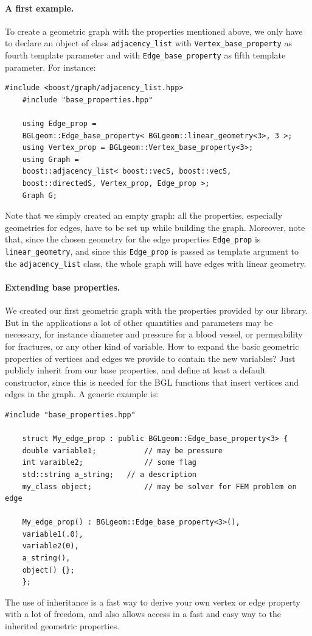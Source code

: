 \documentclass[10pt]{article} %
\newcommand{\classname}[1]{\texttt{#1}}
\begin{document}
	\paragraph{A first example.} To create a geometric graph with the properties mentioned above, we only have to declare an object of class \classname{adjacency\_list} with \classname{Vertex\_base\_property} as fourth template parameter and with \classname{Edge\_base\_property} as fifth template parameter. For instance:
	\begin{lstlisting}[frame=single]
	#include <boost/graph/adjacency_list.hpp>
	#include "base_properties.hpp"
	
	using Edge_prop = 
	BGLgeom::Edge_base_property< BGLgeom::linear_geometry<3>, 3 >;
	using Vertex_prop = BGLgeom::Vertex_base_property<3>;
	using Graph = 
	boost::adjacency_list< boost::vecS, boost::vecS, 
	boost::directedS, Vertex_prop, Edge_prop >;
	Graph G;
	\end{lstlisting}
	Note that we simply created an empty graph: all the properties, especially geometries for edges, have to be set up while building the graph. Moreover, note that, since the chosen geometry for the edge properties \texttt{Edge\_prop} is \texttt{linear\_geometry}, and since this \texttt{Edge\_prop} is passed as template argument to the \classname{adjacency\_list} class, the whole graph will have edges with linear geometry.
	\paragraph{Extending base properties.} We created our first geometric graph with the properties provided by our library. But in the applications a lot of other quantities and parameters may be necessary, for instance diameter and pressure for a blood vessel, or permeability for fractures, or any other kind of variable. How to expand the basic geometric properties of vertices and edges we provide to contain the new variables? Just publicly inherit from our base properties, and define at least a default constructor, since this is needed for the BGL functions that insert vertices and edges in the graph. A generic example is:
	\begin{lstlisting}[frame=single, name=create_graph]
	#include "base_properties.hpp"
	
	struct My_edge_prop : public BGLgeom::Edge_base_property<3> {
	double variable1;			// may be pressure
	int varaible2;				// some flag
	std::string a_string;	// a description
	my_class object;			// may be solver for FEM problem on edge
	
	My_edge_prop() : BGLgeom::Edge_base_property<3>(),
	variable1(.0),
	variable2(0),
	a_string(),
	object() {};	
	};
	\end{lstlisting}
	The use of inheritance is a fast way to derive your own vertex or edge property with a lot of freedom, and also allows access in a fast and easy way to the inherited geometric properties.
\end{document}
